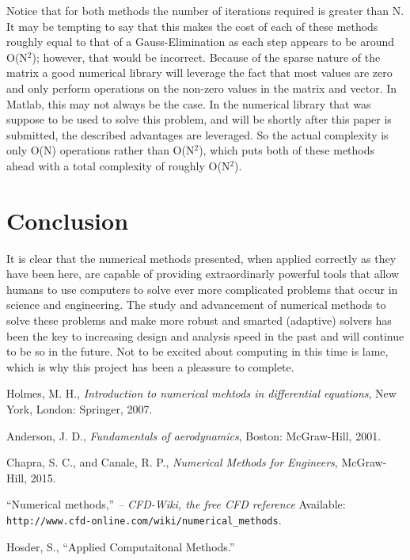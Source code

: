 \documentclass[]{aiaa-tc}%
\begin{document}
Notice that for both methods the number of iterations required is greater than
N. It may be tempting to say that this makes the cost of each of these methods
roughly equal to that of a Gauss-Elimination as each step appears to be around
O(N$^2$); however, that would be incorrect. Because of the sparse nature of the 
matrix a good numerical library will leverage the fact that most values are zero
and only perform operations on the non-zero values in the matrix and vector. In 
Matlab, this may not always be the case. In the numerical library
that was suppose to be used to solve this problem, and will be shortly after this
paper is submitted, the described advantages are leveraged. So the actual complexity
is only O(N) operations rather than O(N$^2$), which puts both of these methods
ahead with a total complexity of roughly O(N$^2$).

\FloatBarrier\section{Conclusion}

It is clear that the numerical methods presented, when applied correctly as
they have been here, are capable of providing extraordinarly powerful tools that
allow humans to use computers to solve ever more complicated problems that occur
in science and engineering. The study and advancement of numerical methods to solve these
problems and make more robust and smarted (adaptive) solvers has been the key to increasing design and
analysis speed in the past and will continue to be so in the future. Not to be
excited about computing in this time is lame, which is why this project has been a pleassure to
complete.

\begin{thebibliography}{9}%
 Holmes, M. H., {\it Introduction to numerical mehtods in differential equations}, New York, London: Springer, 2007.

Anderson, J. D., {\it Fundamentals of aerodynamics}, Boston: McGraw-Hill, 2001.

Chapra, S. C., and Canale, R. P., {\it Numerical Methods for Engineers}, McGraw-Hill, 2015.

“Numerical methods,” {\it -- CFD-Wiki, the free CFD reference} Available: \verb+http://www.cfd-online.com/wiki/numerical_methods+.

Hosder, S., “Applied Computaitonal Methods.” 

\end{thebibliography}
\end{document}
